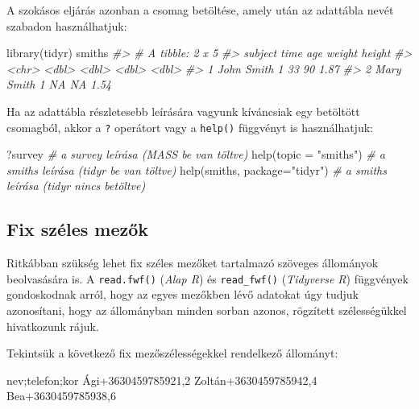 \documentclass[
]{book}
\newenvironment{Shaded}{\begin{snugshade}}{\end{snugshade}}
\newcommand{\AttributeTok}[1]{\textcolor[rgb]{0.77,0.63,0.00}{#1}}
\newcommand{\CommentTok}[1]{\textcolor[rgb]{0.56,0.35,0.01}{\textit{#1}}}
\newcommand{\FunctionTok}[1]{\textcolor[rgb]{0.00,0.00,0.00}{#1}}
\newcommand{\NormalTok}[1]{#1}
\newcommand{\StringTok}[1]{\textcolor[rgb]{0.31,0.60,0.02}{#1}}
\begin{document}
A szokásos eljárás azonban a csomag betöltése, amely után az adattábla nevét szabadon használhatjuk:

\begin{Shaded}
\begin{Highlighting}[]
\FunctionTok{library}\NormalTok{(tidyr)}
\NormalTok{smiths}
\CommentTok{\#\textgreater{} \# A tibble: 2 x 5}
\CommentTok{\#\textgreater{}   subject     time   age weight height}
\CommentTok{\#\textgreater{}   \textless{}chr\textgreater{}      \textless{}dbl\textgreater{} \textless{}dbl\textgreater{}  \textless{}dbl\textgreater{}  \textless{}dbl\textgreater{}}
\CommentTok{\#\textgreater{} 1 John Smith     1    33     90   1.87}
\CommentTok{\#\textgreater{} 2 Mary Smith     1    NA     NA   1.54}
\end{Highlighting}
\end{Shaded}

Ha az adattábla részletesebb leírására vagyunk kíváncsiak egy betöltött csomagból, akkor a \texttt{?} operátort vagy a \texttt{help()} függvényt is használhatjuk:

\begin{Shaded}
\begin{Highlighting}[]
\NormalTok{?survey                        }\CommentTok{\# a survey leírása (MASS be van töltve)}
\FunctionTok{help}\NormalTok{(}\AttributeTok{topic =} \StringTok{"smiths"}\NormalTok{)         }\CommentTok{\# a smiths leírása (tidyr be van töltve)}
\FunctionTok{help}\NormalTok{(smiths, }\AttributeTok{package=}\StringTok{"tidyr"}\NormalTok{)  }\CommentTok{\# a smiths leírása (tidyr nincs betöltve)}
\end{Highlighting}
\end{Shaded}

\hypertarget{fix-szuxe9les-mezux151k}{%
\subsection{Fix széles mezők}\label{fix-szuxe9les-mezux151k}}

Ritkábban szükség lehet fix széles mezőket tartalmazó szöveges állományok beolvasására is. A \texttt{read.fwf()} (\emph{Alap R}) és \texttt{read\_fwf()} (\emph{Tidyverse R}) függvények gondoskodnak arról, hogy az egyes mezőkben lévő adatokat úgy tudjuk azonosítani, hogy az állományban minden sorban azonos, rögzített szélességükkel hivatkozunk rájuk.

Tekintsük a következő fix mezőszélességekkel rendelkező állományt:

\begin{Shaded}
\begin{Highlighting}[]
\NormalTok{nev;telefon;kor}
\NormalTok{    Ági+3630459785921,2}
\NormalTok{ Zoltán+3630459785942,4}
\NormalTok{    Bea+3630459785938,6}
\end{Highlighting}
\end{Shaded}
\end{document}
